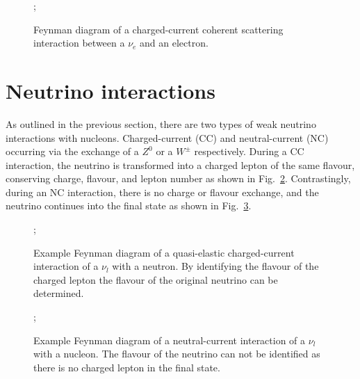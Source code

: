 \begin{figure} %
    ;
    \caption[$\nu_{e}$ coherent scattering Feynman diagram]
    {Feynman diagram of a charged-current coherent scattering interaction between a $\nu_{e}$ and
        an electron.}
    \label{fig:coherent_scattering}
\end{figure}

\section{Neutrino interactions} %
\label{sec:theory_interactions} %

As outlined in the previous section, there are two types of weak neutrino interactions with
nucleons. Charged-current (CC) and neutral-current (NC) occurring via the exchange of a $Z^{0}$ or
a $W^{\pm}$ respectively. During a CC interaction, the neutrino is transformed into a charged
lepton of the same flavour, conserving charge, flavour, and lepton number as shown in
Fig.~\ref{fig:cc_interaction}. Contrastingly, during an NC interaction, there is no charge or
flavour exchange, and the neutrino continues into the final state as shown in
Fig.~\ref{fig:nc_interaction}.

\begin{figure} %
    ;
    \caption[Feynman diagram of a charged-current interaction.]
    {Example Feynman diagram of a quasi-elastic charged-current interaction of a $\nu_{l}$ with a
        neutron. By identifying the flavour of the charged lepton the flavour of the original
        neutrino can be determined.}
    \label{fig:cc_interaction}
\end{figure}

\begin{figure} %
    ;
    \caption[Feynman diagram of a neutral-current interaction.]
    {Example Feynman diagram of a neutral-current interaction of a $\nu_{l}$ with a nucleon. The
        flavour of the neutrino can not be identified as there is no charged lepton in the final
        state.}
    \label{fig:nc_interaction}
\end{figure}

